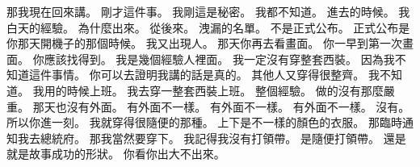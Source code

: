 \hypertarget{c01:cue:3294}{}那我現在回來講。
\hypertarget{c01:cue:3295}{}剛才這件事。
\hypertarget{c01:cue:3296}{}我剛這是秘密。
\hypertarget{c01:cue:3297}{}我都不知道。
\hypertarget{c01:cue:3298}{}進去的時候。
\hypertarget{c01:cue:3299}{}我白天的經驗。
\hypertarget{c01:cue:3300}{}為什麼出來。
\hypertarget{c01:cue:3301}{}從後來。
\hypertarget{c01:cue:3302}{}洩漏的名單。
\hypertarget{c01:cue:3303}{}不是正式公布。
\hypertarget{c01:cue:3304}{}正式公布是你那天開機子的那個時候。
\hypertarget{c01:cue:3305}{}我又出現人。
\hypertarget{c01:cue:3306}{}那天你再去看畫面。
\hypertarget{c01:cue:3307}{}你一早到第一次畫面。
\hypertarget{c01:cue:3308}{}你應該找得到。
\hypertarget{c01:cue:3309}{}我是幾個經驗人裡面。
\hypertarget{c01:cue:3310}{}我一定沒有穿整套西裝。
\hypertarget{c01:cue:3311}{}因為我不知道這件事情。
\hypertarget{c01:cue:3312}{}你可以去證明我講的話是真的。
\hypertarget{c01:cue:3313}{}其他人又穿得很整齊。
\hypertarget{c01:cue:3314}{}我不知道。
\hypertarget{c01:cue:3315}{}我用的時候上班。
\hypertarget{c01:cue:3316}{}我去穿一整套西裝上班。
\hypertarget{c01:cue:3317}{}整個經驗。
\hypertarget{c01:cue:3318}{}做的沒有那麼嚴重。
\hypertarget{c01:cue:3319}{}那天也沒有外面。
\hypertarget{c01:cue:3320}{}有外面不一樣。
\hypertarget{c01:cue:3321}{}有外面不一樣。
\hypertarget{c01:cue:3322}{}有外面不一樣。
\hypertarget{c01:cue:3323}{}沒有。
\hypertarget{c01:cue:3324}{}所以你進一刻。
\hypertarget{c01:cue:3325}{}我就穿得很隨便的那種。
\hypertarget{c01:cue:3326}{}上下是不一樣的顏色的衣服。
\hypertarget{c01:cue:3327}{}那臨時通知我去總統府。
\hypertarget{c01:cue:3328}{}那我當然要穿下。
\hypertarget{c01:cue:3329}{}我記得我沒有打領帶。
\hypertarget{c01:cue:3330}{}是隨便打領帶。
\hypertarget{c01:cue:3331}{}還是就是故事成功的形狀。
\hypertarget{c01:cue:3332}{}你看你出大不出來。

